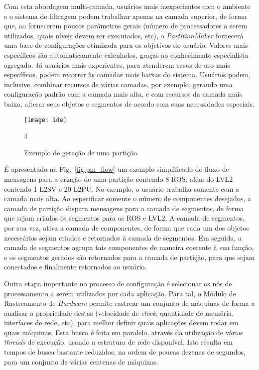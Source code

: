 Com esta abordagem multi-camada, usuários mais inexperientes com o ambiente e o sistema de filtragem podem trabalhar apenas na camada superior, de forma que, ao fornecerem poucos parâmetros gerais (número de processadores a serem utilizados, quais níveis devem ser executados, etc), o \emph{PartitionMaker} fornecerá uma base de configurações otimizada para os objetivos do usuário. Valores mais específicos são automaticamente calculados, graças ao conhecimento especialista agregado. Já usuários mais experientes, para atenderem casos de uso mais específicos, podem recorrer às camadas mais baixas do sistema. Usuários podem, inclusive, combinar recursos de várias camadas, por exemplo, gerando uma configuração padrão com a camada mais alta, e com recursos da camada mais baixa, alterar seus objetos e segmentos de acordo com suas necessidades especiais.

\begin{figure}[t]
\begin{center}
\texttt{[image: ide]}
\caption{Exemplo de geração de uma partição.}
\label{fig:ide}4
\end{center}
\end{figure}

É apresentado na Fig.~\ref{fig:pm_flow} um exemplo simplificado do fluxo de mensagens para a criação de uma partição contendo 8 ROS, além do LVL2 contendo 1 L2SV e 20 L2PU. No exemplo, o usuário trabalha somente com a camada mais alta. Ao especificar somente o número de componentes desejados, a camada de partição dispara mensagens para a camada de segmentos, de forma que sejam criados os segmentos para os ROS e LVL2. A camada de segmentos, por sua vez, ativa a camada de componentes, de forma que cada um dos objetos necessários sejam criados e retornados à camada de segmentos. Em seguida, a camada de segmentos agrupa tais componentes de maneira coerente à sua função, e os segmentos gerados são retornados para a camada de partição, para que sejam conectados e finalmente retornados ao usuário.

Outra etapa importante no processo de configuração é selecionar os nós de processamento a serem utilizados por cada aplicação. Para tal, o Módulo de Rastreamento de \emph{Hardware} permite rastrear um conjunto de máquinas de forma a analisar a propriedade destas (velocidade de \emph{clock}, quantidade de memória, interfaces de rede, etc), para melhor definir quais aplicações devem rodar em quais máquinas. Esta busca é feita em paralelo, através da utilização de várias \emph{threads} \cite{bib:modern_operating_systems} de execução, usando a estrutura de rede disponível. Isto resulta em tempos de busca bastante reduzidos, na ordem de poucas dezenas de segundos, para um conjunto de várias centenas de máquinas. 

